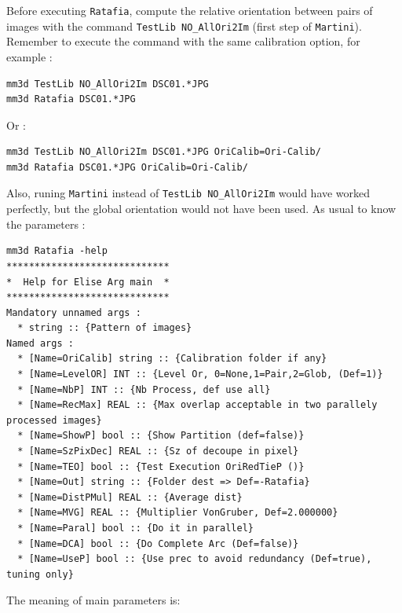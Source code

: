 Before executing {\tt Ratafia}, compute the relative orientation between pairs of images with
the  command {\tt TestLib NO\_AllOri2Im}
(first step of {\tt Martini}). Remember to execute the command with the same calibration option, for example :


\begin{verbatim}
mm3d TestLib NO_AllOri2Im DSC01.*JPG
mm3d Ratafia DSC01.*JPG
\end{verbatim}

Or :

\begin{verbatim}
mm3d TestLib NO_AllOri2Im DSC01.*JPG OriCalib=Ori-Calib/
mm3d Ratafia DSC01.*JPG OriCalib=Ori-Calib/
\end{verbatim}


Also, runing {\tt Martini} instead of  {\tt TestLib NO\_AllOri2Im} would have worked perfectly, 
but the global orientation would not have been used. As usual to know the parameters :

\begin{verbatim}
mm3d Ratafia -help
*****************************
*  Help for Elise Arg main  *
*****************************
Mandatory unnamed args : 
  * string :: {Pattern of images}
Named args : 
  * [Name=OriCalib] string :: {Calibration folder if any}
  * [Name=LevelOR] INT :: {Level Or, 0=None,1=Pair,2=Glob, (Def=1)}
  * [Name=NbP] INT :: {Nb Process, def use all}
  * [Name=RecMax] REAL :: {Max overlap acceptable in two parallely processed images}
  * [Name=ShowP] bool :: {Show Partition (def=false)}
  * [Name=SzPixDec] REAL :: {Sz of decoupe in pixel}
  * [Name=TEO] bool :: {Test Execution OriRedTieP ()}
  * [Name=Out] string :: {Folder dest => Def=-Ratafia}
  * [Name=DistPMul] REAL :: {Average dist}
  * [Name=MVG] REAL :: {Multiplier VonGruber, Def=2.000000}
  * [Name=Paral] bool :: {Do it in parallel}
  * [Name=DCA] bool :: {Do Complete Arc (Def=false)}
  * [Name=UseP] bool :: {Use prec to avoid redundancy (Def=true), tuning only}
\end{verbatim}

The meaning of main parameters is:

